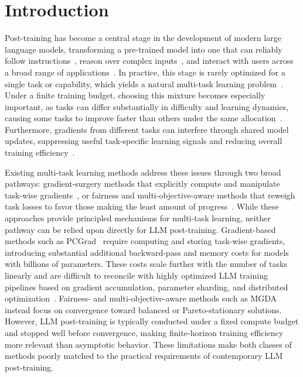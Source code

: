 \section{Introduction}
Post-training has become a central stage in the development of modern large language models, transforming a pre-trained model into one that can reliably follow instructions~\citep{ouyang2022training}, reason over complex inputs~\citep{deep-seek-r1}, and interact with users across a broad range of applications~\citep{openclaw-rl2026,yue2026interactivebenchmarks}. In practice, this stage is rarely optimized for a single task or capability, which yields a natural multi-task learning problem~\citep{nvidia2025nemotron3nanoopen}. Under a finite training budget, choosing this mixture becomes especially important, as tasks can differ substantially in difficulty and learning dynamics, causing some tasks to improve faster than others under the same allocation~\citep{wu2025imbalancedgradientsrlposttraining}. Furthermore, gradients from different tasks can interfere through shared model updates, suppressing useful task-specific learning signals and reducing overall training efficiency~\citep{pcgrad2020,cagrad2021}.

Existing multi-task learning methods address these issues through two broad pathways: gradient-surgery methods that explicitly compute and manipulate task-wise gradients~\citep{pcgrad2020,cagrad2021}, or fairness and multi-objective-aware methods that reweigh task losses to favor those making the least amount of progress~\citep{cagrad2021,sener2018mgda}. While these approaches provide principled mechanisms for multi-task learning, neither pathway can be relied upon directly for LLM post-training. Gradient-based methods such as PCGrad~\citep{pcgrad2020} require computing and storing task-wise gradients, introducing substantial additional backward-pass and memory costs for models with billions of parameters. These costs scale further with the number of tasks linearly and are difficult to reconcile with highly optimized LLM training pipelines based on gradient accumulation, parameter sharding, and distributed optimization~\citep{sheng2024hybridflow}. Fairness- and multi-objective-aware methods such as MGDA instead focus on convergence toward balanced or Pareto-stationary solutions. However, LLM post-training is typically conducted under a fixed compute budget and stopped well before convergence, making finite-horizon training efficiency more relevant than asymptotic behavior. These limitations make both classes of methods poorly matched to the practical requirements of contemporary LLM post-training.

